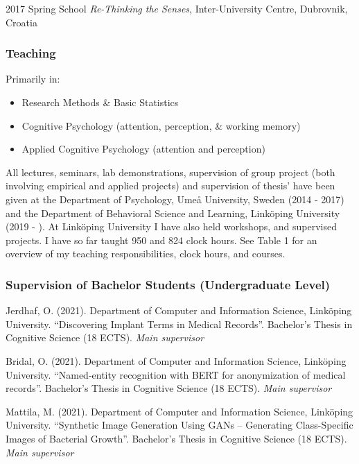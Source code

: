 \documentclass[]{article}
\providecommand{\tightlist}{%
  \setlength{\itemsep}{0pt}\setlength{\parskip}{0pt}}
\begin{document}
2017 Spring School \emph{Re-Thinking the Senses}, Inter-University
Centre, Dubrovnik, Croatia

\hypertarget{teaching}{%
\subsubsection{Teaching}\label{teaching}}

Primarily in:

\begin{itemize}
\tightlist
\item
  Research Methods \& Basic Statistics
\item
  Cognitive Psychology (attention, perception, \& working memory)
\item
  Applied Cognitive Psychology (attention and perception)
\end{itemize}

All lectures, seminars, lab demonstrations, supervision of group project
(both involving empirical and applied projects) and supervision of
thesis' have been given at the Department of Psychology, Umeå
University, Sweden (2014 - 2017) and the Department of Behavioral
Science and Learning, Linköping University (2019 - ). At Linköping
University I have also held workshops, and supervised projects. I have
so far taught 950 and 824 clock hours. See Table 1 for an overview of my
teaching responsibilities, clock hours, and courses.

\hypertarget{supervision-of-bachelor-students-undergraduate-level}{%
\subsubsection{Supervision of Bachelor Students (Undergraduate
Level)}\label{supervision-of-bachelor-students-undergraduate-level}}

Jerdhaf, O. (2021). Department of Computer and Information Science,
Linköping University. ``Discovering Implant Terms in Medical Records''.
Bachelor's Thesis in Cognitive Science (18 ECTS). \emph{Main supervisor}

Bridal, O. (2021). Department of Computer and Information Science,
Linköping University. ``Named-entity recognition with BERT for
anonymization of medical records''. Bachelor's Thesis in Cognitive
Science (18 ECTS). \emph{Main supervisor}

Mattila, M. (2021). Department of Computer and Information Science,
Linköping University. ``Synthetic Image Generation Using GANs --
Generating Class-Specific Images of Bacterial Growth''. Bachelor's
Thesis in Cognitive Science (18 ECTS). \emph{Main supervisor}
\end{document}
